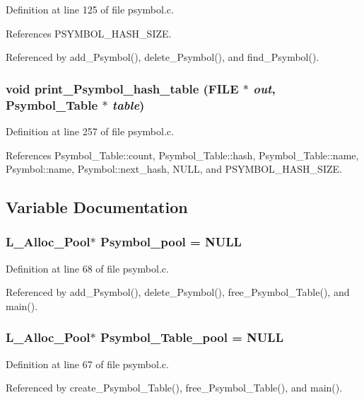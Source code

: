 Definition at line 125 of file psymbol.c.

References PSYMBOL\_\-HASH\_\-SIZE.

Referenced by add\_\-Psymbol(), delete\_\-Psymbol(), and find\_\-Psymbol().
\subsubsection{\setlength{\rightskip}{0pt plus 5cm}void print\_\-Psymbol\_\-hash\_\-table (FILE $\ast$ {\em out}, \bf{Psymbol\_\-Table} $\ast$ {\em table})}\label{psymbol_8c_73be357f45bd4e9041cd442895b011fc}




Definition at line 257 of file psymbol.c.

References Psymbol\_\-Table::count, Psymbol\_\-Table::hash, Psymbol\_\-Table::name, Psymbol::name, Psymbol::next\_\-hash, NULL, and PSYMBOL\_\-HASH\_\-SIZE.

\subsection{Variable Documentation}
\subsubsection{\setlength{\rightskip}{0pt plus 5cm}\bf{L\_\-Alloc\_\-Pool}$\ast$ \bf{Psymbol\_\-pool} = \bf{NULL}}\label{psymbol_8c_5083a45146f9908a31dac227cbe18aac}




Definition at line 68 of file psymbol.c.

Referenced by add\_\-Psymbol(), delete\_\-Psymbol(), free\_\-Psymbol\_\-Table(), and main().
\subsubsection{\setlength{\rightskip}{0pt plus 5cm}\bf{L\_\-Alloc\_\-Pool}$\ast$ \bf{Psymbol\_\-Table\_\-pool} = \bf{NULL}}\label{psymbol_8c_2d729e93a340ce1b90a4aba0da407dc3}




Definition at line 67 of file psymbol.c.

Referenced by create\_\-Psymbol\_\-Table(), free\_\-Psymbol\_\-Table(), and main().